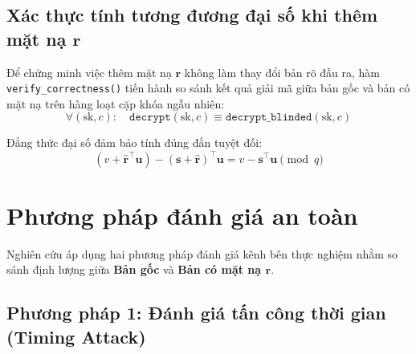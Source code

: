 \documentclass[../LuanVan.tex]{subfiles}
\begin{document}
\subsection{Xác thực tính tương đương đại số khi thêm mặt nạ \texorpdfstring{$\mathbf{r}$}{r}}

Để chứng minh việc thêm mặt nạ $\mathbf{r}$ không làm thay đổi bản rõ đầu ra, hàm \texttt{verify\_correctness()} tiến hành so sánh kết quả giải mã giữa bản gốc và bản có mặt nạ trên hàng loạt cặp khóa ngẫu nhiên:
\begin{equation}
\forall (\text{sk}, c): \quad \texttt{decrypt}(\text{sk}, c) \equiv \texttt{decrypt\_blinded}(\text{sk}, c)
\end{equation}

Đẳng thức đại số đảm bảo tính đúng đắn tuyệt đối:
\begin{equation}
(v + \hat{\mathbf{r}}^\top \mathbf{u}) - (\mathbf{s} + \hat{\mathbf{r}})^\top \mathbf{u} = v - \mathbf{s}^\top \mathbf{u} \pmod q
\end{equation}



\section{Phương pháp đánh giá an toàn}
\label{sec:phuongphap}

Nghiên cứu áp dụng hai phương pháp đánh giá kênh bên thực nghiệm nhằm so sánh định lượng giữa \textbf{Bản gốc} và \textbf{Bản có mặt nạ $\mathbf{r}$}.

\subsection{Phương pháp 1: Đánh giá tấn công thời gian (Timing Attack)}
\end{document}
